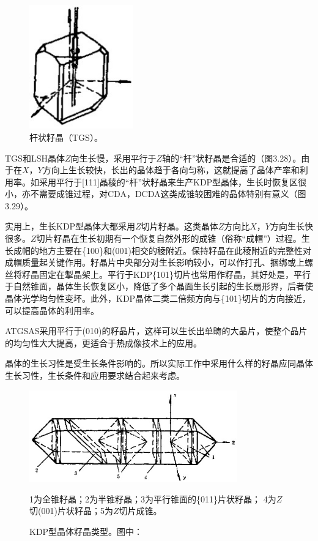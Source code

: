\begin{figure}[htbp]
 \centering
 \includegraphics[width=0.4\textwidth]{fig/cp03/img3.28.jpg}
 \caption{杆状籽晶（TGS）。}
\end{figure}

TGS和LSH晶体$Z$向生长慢，采用平行于$Z$轴的“杆”状籽晶是合适的（图3.28）。由于在$X$，$Y$方向上生长较快，长出的晶体趋于各向匀称，这就提高了晶体产率和利用率。如采用平行于[111]晶稜的“杆”状籽晶来生产KDP型晶体，生长时恢复区很小，亦不需要成锥过程，对CDA，DCDA这类成锥较困难的晶体特别有意义（图3.29）。

实用上，生长KDP型晶体大都采用$Z$切片籽晶。这类晶体$Z$方向比$X$，$Y$方向生长快很多。$Z$切片籽晶在生长初期有一个恢复自然外形的成锥（俗称“成帽”）过程。生长成帽的地方主要在\{100\}和(001)相交的稜附近。保持籽晶在此稜附近的完整性对成帽质量起关键作用。籽晶片中央部分对生长影响较小，可以作打孔、捆绑或上螺丝将籽晶固定在掣晶架上。平行于KDP\{101\}切片也常用作籽晶，其好处是，平行于自然锥面，晶体生长恢复区小，降低了多个晶面生长引起的生长扇形界，后者使晶体光学均匀性变坏。此外，KDP晶体二类二倍频方向与\{101\}切片的方向接近，可以提高晶体的利用率。

ATGSAS采用平行于(010)的籽晶片，这样可以生长出单畴的大晶片，使整个晶片的均匀性大大提高，更适合于热成像技术上的应用。

晶体的生长习性是受生长条件影响的。所以实际工作中采用什么样的籽晶应同晶体生长习性，生长条件和应用要求结合起来考虑。

\begin{figure}[htbp]
 \centering
 \includegraphics[width=0.8\textwidth]{fig/cp03/img3.29.jpg}
 \caption{KDP型晶体籽晶类型。图中：}
 1为全锥籽晶；2为半锥籽晶；3为平行锥面的\{011\}片状籽晶；
 4为$Z$切(001)片状籽晶；5为$Z$切片成锥。
\end{figure}